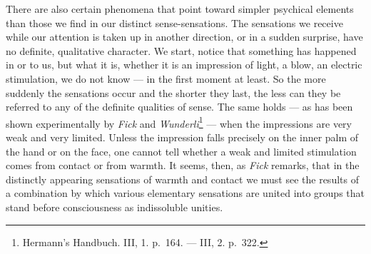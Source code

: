 \documentclass[12pt,a4paper]{book}
\newcommand{\opage}[1]{\marginnote{\footnotesize\textit{[#1]}}}
\begin{document}
There are also certain phenomena that point toward simpler psychical
elements than those we find in our distinct sense-sensations. The
sensations we receive while
\opage{126}our attention is taken up in another direction, or in a sudden
surprise, have no definite, qualitative character. We start, notice that
something has happened in or to us, but what it is, whether it is an
impression of light, a blow, an electric stimulation, we do not know ---
in the first moment at least. So the more suddenly the sensations occur
and the shorter they last, the less can they be referred to any of the
definite qualities of sense. The same holds --- as has been shown
experimentally by \emph{Fick} and
\emph{Wunderli}\footnote{Hermann’s Handbuch. III, 1. p.~164. --- III,
2. p.~322.} --- when the impressions are very weak and very limited.
Unless the impression falls precisely on the inner palm of the hand or
on the face, one cannot tell whether a weak and limited stimulation
comes from contact or from warmth. It seems, then, as \emph{Fick}
remarks, that in the distinctly appearing sensations of warmth and
contact we must see the results of a combination by which various
elementary sensations are united into groups that stand before
consciousness as indissoluble unities.
\end{document}
